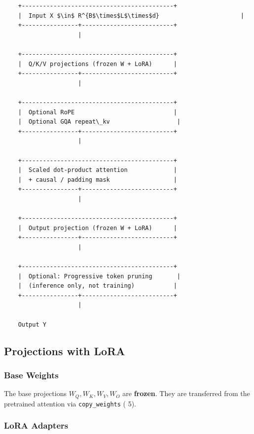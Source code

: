 \begin{lstlisting}
    +-------------------------------------------+
    |  Input X $\in$ R^{B$\times$L$\times$d}                       |
    +----------------+--------------------------+
                     |
                      
    +-------------------------------------------+
    |  Q/K/V projections (frozen W + LoRA)      |
    +----------------+--------------------------+
                     |
                      
    +-------------------------------------------+
    |  Optional RoPE                            |
    |  Optional GQA repeat\_kv                   |
    +----------------+--------------------------+
                     |
                      
    +-------------------------------------------+
    |  Scaled dot-product attention             |
    |  + causal / padding mask                  |
    +----------------+--------------------------+
                     |
                      
    +-------------------------------------------+
    |  Output projection (frozen W + LoRA)      |
    +----------------+--------------------------+
                     |
                      
    +-------------------------------------------+
    |  Optional: Progressive token pruning       |
    |  (inference only, not training)           |
    +----------------+--------------------------+
                     |
                      
    Output Y
\end{lstlisting}

\subsection{Projections with LoRA}

\subsubsection{Base Weights}

The base projections $W_Q, W_K, W_V, W_O$ are \textbf{frozen}. They are 
transferred from the pretrained attention via \texttt{copy\_weights} ( 5).

\subsubsection{LoRA Adapters}


